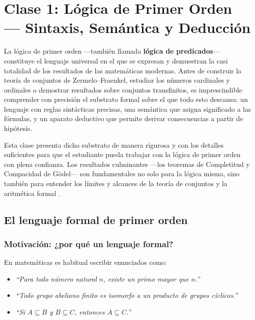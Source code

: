 \chapter{Clase 1: Lógica de Primer Orden --- Sintaxis, Semántica y Deducción}

La lógica de primer orden —también llamada \textbf{lógica de predicados}— constituye el lenguaje universal en el que se expresan y demuestran la casi totalidad de los resultados de las matemáticas modernas. Antes de construir la teoría de conjuntos de Zermelo–Fraenkel, estudiar los números cardinales y ordinales o demostrar resultados sobre conjuntos transfinitos, es imprescindible comprender con precisión el substrato formal sobre el que todo esto descansa: un lenguaje con reglas sintácticas precisas, una semántica que asigna significado a las fórmulas, y un aparato deductivo que permite derivar consecuencias a partir de hipótesis.

Esta clase presenta dicho substrato de manera rigurosa y con los detalles suficientes para que el estudiante pueda trabajar con la lógica de primer orden con plena confianza. Los resultados culminantes —los teoremas de Completitud y Compacidad de Gödel— son fundamentales no solo para la lógica misma, sino también para entender los límites y alcances de la teoría de conjuntos y la aritmética formal \cite{godel1930, enderton2001}.

\section{El lenguaje formal de primer orden}

\subsection{Motivación: ¿por qué un lenguaje formal?}

En matemáticas es habitual escribir enunciados como:
\begin{itemize}
  \item \textit{``Para todo número natural $n$, existe un primo mayor que $n$.''}
  \item \textit{``Todo grupo abeliano finito es isomorfo a un producto de grupos cíclicos.''}
  \item \textit{``Si $A \subseteq B$ y $B \subseteq C$, entonces $A \subseteq C$.''}
\end{itemize}

